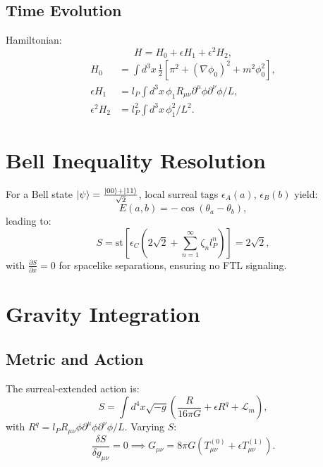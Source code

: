 \documentclass{article}
\begin{document}
\subsection{Time Evolution}
Hamiltonian:
\begin{equation}
H = H_0 + \epsilon H_1 + \epsilon^2 H_2,
\end{equation}
\begin{align}
H_0 &= \int d^3x \, \frac{1}{2} [\pi^2 + (\nabla \phi_0)^2 + m^2 \phi_0^2], \\
\epsilon H_1 &= l_P \int d^3x \, \phi_1 R_{\mu\nu} \partial^\mu \phi \partial^\nu \phi / L, \\
\epsilon^2 H_2 &= l_P^2 \int d^3x \, \phi_1^2 / L^2.
\end{align}

\section{Bell Inequality Resolution}
For a Bell state \(\ket{\psi} = \frac{\ket{00} + \ket{11}}{\sqrt{2}}\), local surreal tags \(\epsilon_A(a)\), \(\epsilon_B(b)\) yield:
\begin{equation}
E(a,b) = -\cos(\theta_a - \theta_b),
\end{equation}
leading to:
\begin{equation}
S = \text{st}\left[ \epsilon_C \left(2\sqrt{2} + \sum_{n=1}^\infty \zeta_n l_P^n\right) \right] = 2\sqrt{2},
\end{equation}
with \(\frac{\partial S}{\partial x} = 0\) for spacelike separations, ensuring no FTL signaling.

\section{Gravity Integration}
\subsection{Metric and Action}
The surreal-extended action is:
\begin{equation}
S = \int d^4x \sqrt{-g} \left( \frac{R}{16\pi G} + \epsilon R^q + \mathcal{L}_m \right),
\end{equation}
with \(R^q = l_P R_{\mu\nu} \phi \partial^\mu \phi \partial^\nu \phi / L\). Varying \(S\):
\begin{equation}
\frac{\delta S}{\delta g_{\mu\nu}} = 0 \implies G_{\mu\nu} = 8\pi G \left( T_{\mu\nu}^{(0)} + \epsilon T_{\mu\nu}^{(1)} \right).
\end{equation}
\end{document}
